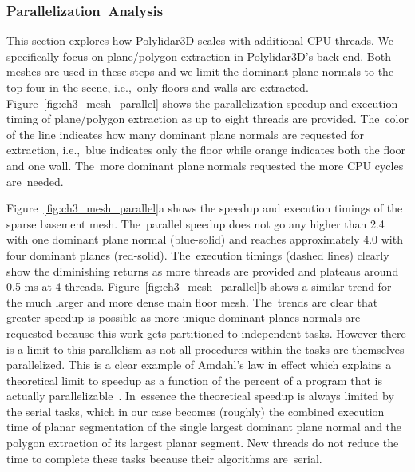 \subsubsection{Parallelization~Analysis}

This section explores how Polylidar3D scales with additional CPU threads. We specifically focus on plane/polygon extraction in Polylidar3D's back-end. Both meshes are used in these steps and we limit the dominant plane normals to the top four in the scene, i.e.,~only floors and walls are extracted. Figure~\ref{fig:ch3_mesh_parallel} shows the parallelization speedup and execution timing of plane/polygon extraction as up to eight threads are provided. The~color of the line indicates how many dominant plane normals are requested for extraction, i.e.,~blue indicates only the floor while orange indicates both the floor and one wall. The~more dominant plane normals requested the more CPU cycles are~needed.  

Figure~\ref{fig:ch3_mesh_parallel}a shows the speedup and execution timings of the sparse basement mesh. The~parallel speedup does not go any higher than 2.4 with one dominant plane normal (blue-solid) and reaches approximately 4.0 with four dominant planes (red-solid). The~execution timings (dashed lines) clearly show the diminishing returns as more threads are provided and plateaus around 0.5 ms at 4 threads. Figure~\ref{fig:ch3_mesh_parallel}b shows a similar trend for the much larger and more dense main floor mesh. The~trends are clear that greater speedup is possible as more unique dominant planes normals are requested because this work gets partitioned to independent tasks. However there is a  limit to this parallelism as not all procedures within the tasks are themselves parallelized. This is a clear example of Amdahl's law in effect which explains a theoretical limit to speedup as a function of the percent of a program that is actually parallelizable~\cite{amdahl_validity_1967}. In~essence the theoretical speedup is always limited by the serial tasks, which in our case becomes (roughly) the combined execution time of planar segmentation of the single largest dominant plane normal and the polygon extraction of its largest planar segment. New threads do not reduce the time to complete these tasks because their algorithms are~serial.

